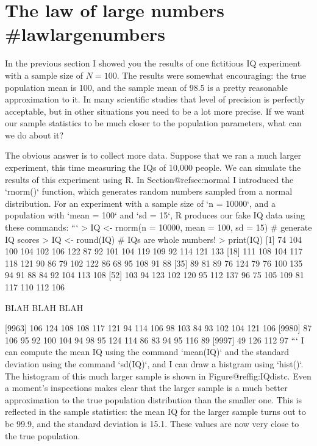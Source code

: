 \section{The law of large numbers {#lawlargenumbers}}

In the previous section I showed you the results of one fictitious IQ experiment with a sample size of $N=100$. The results were somewhat encouraging: the true population mean is 100, and the sample mean of 98.5 is a pretty reasonable approximation to it. In many scientific studies that level of precision is perfectly acceptable, but in other situations you need to be a lot more precise. If we want our sample statistics to be much closer to the population parameters, what can we do about it?

The obvious answer is to collect more data. Suppose that we ran a much larger experiment, this time measuring the IQs of 10,000 people. We can simulate the results of this experiment using R. In Section@refsec:normal I introduced the `rnorm()` function, which generates random numbers sampled from a normal distribution. For an experiment with a sample size of `n = 10000`, and a population with `mean = 100` and `sd = 15`, R produces our fake IQ data using these commands:
```
> IQ <- rnorm(n = 10000, mean = 100, sd = 15) # generate IQ scores
> IQ <- round(IQ) # IQs are whole numbers!
> print(IQ)
    [1]  74 104 100 104 102 106 122  87  92 101 104 119 109  92 114 121 133
   [18] 111 108 104 117 118 121  90  86  79 102 122  86  68  95 108  91  88
   [35]  89  81  89  76 124  79  76 100 135  94  91  88  84  92 104 113 108
   [52] 103  94 123 102 120  95 112 137  96  75 105 109  81 117 110 112 106
 
BLAH BLAH BLAH

 [9963] 106 124 108 108 117 121  94 114 106  98 103  84  93 102 104 121 106
 [9980]  87 106  95  92 100 104  94  98  95 124 114  86  83  94  95 116  89
 [9997]  49 126 112  97
```
I can compute the mean IQ using the command `mean(IQ)` and the standard deviation using the command `sd(IQ)`, and I can draw a histgram using `hist()`. The histogram of this much larger sample is shown in Figure@reffig:IQdistc. Even a moment's inspections makes clear that the larger sample is a much better approximation to the true population distribution than the smaller one. This is reflected in the sample statistics: the mean IQ for the larger sample turns out to be 99.9, and the standard deviation is 15.1. These values are now very close to the true population.

